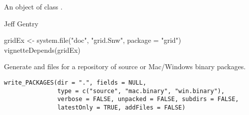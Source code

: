%
\begin{Value}
An object of class .
\end{Value}
%
\begin{Author}\relax
 Jeff Gentry 
\end{Author}
%
\begin{SeeAlso}\relax
{}
\end{SeeAlso}
%
\begin{Examples}
\begin{ExampleCode}
gridEx <- system.file("doc", "grid.Snw", package = "grid")
vignetteDepends(gridEx)
\end{ExampleCode}
\end{Examples}
%
\begin{Description}\relax
Generate  and  files for a
repository of source or Mac/Windows binary packages.
\end{Description}
%
\begin{Usage}
\begin{verbatim}
write_PACKAGES(dir = ".", fields = NULL,
               type = c("source", "mac.binary", "win.binary"),
               verbose = FALSE, unpacked = FALSE, subdirs = FALSE,
               latestOnly = TRUE, addFiles = FALSE)
\end{verbatim}
\end{Usage}
%

